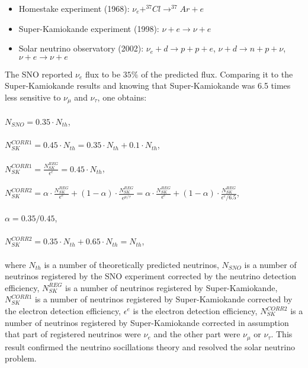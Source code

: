 \begin{itemize}
\item Homestake experiment (1968): $\nu_e + ^{37}Cl \rightarrow ^{37}Ar+e$
\item Super-Kamiokande experiment (1998): $\nu + e \rightarrow \nu + e$ 
\item Solar neutrino observatory (2002): $\nu_e + d \rightarrow p+p+e$, $\nu+d \rightarrow n+p+\nu$, $\nu+e \rightarrow \nu+e$
\end{itemize}
The SNO reported $\nu_e$ flux to be $35\%$ of the predicted flux. Comparing it to the Super-Kamiokande results and knowing that Super-Kamiokande was 6.5 times less sensitive to $\nu_\mu$ and $\nu_\tau$, one obtains:\\ \\
$N_{SNO}=0.35 \cdot N_{th}$,\\ \\
$N_{SK}^{CORR1}=0.45 \cdot N_{th}=0.35 \cdot N_{th}+0.1 \cdot N_{th}$,\\ \\
$N_{SK}^{CORR1}=\frac{N_{SK}^{REG}}{\epsilon^{e}}=0.45 \cdot N_{th} $,\\ \\
$N_{SK}^{CORR2}=\alpha \cdot \frac{N_{SK}^{REG}}{\epsilon^{e}}+(1-\alpha) \cdot \frac{N_{SK}^{REG}}{\epsilon^{\mu/\tau}}=\alpha \cdot \frac{N_{SK}^{REG}}{\epsilon^{e}}+(1-\alpha) \cdot \frac{N_{SK}^{REG}}{\epsilon^{e}/6.5}$,\\ \\
$\alpha=0.35/0.45$,\\ \\
$N_{SK}^{CORR2}=0.35 \cdot N_{th}+0.65 \cdot N_{th}=N_{th}$,\\ \\
where $N_{th}$ is a number of theoretically predicted neutrinos, $N_{SNO}$ is a number of neutrinos registered by the SNO experiment corrected by the neutrino detection efficiency, $N_{SK}^{REG}$ is a number of neutrinos registered by Super-Kamiokande, $N_{SK}^{CORR1}$ is a number of neutrinos registered by Super-Kamiokande corrected by the electron detection efficiency, $\epsilon^{e}$ is the electron detection efficiency, $N_{SK}^{CORR2}$ is a number of neutrinos registered by Super-Kamiokande corrected in assumption that part of registered neutrinos were $\nu_e$ and the other part were $\nu_\mu$ or $\nu_\tau$. This result confirmed the neutrino socillations theory and resolved the solar neutrino problem.\\ \\
